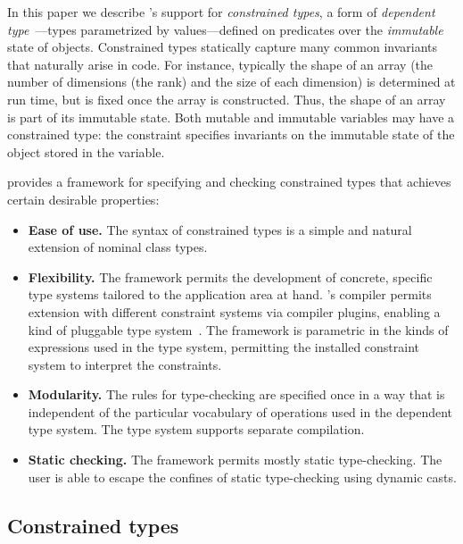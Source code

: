 In this paper we describe {\Xten}'s support for {\em
constrained types},
a form of {\em dependent
type}~\cite{dependent-types,xi99dependent,ocrz-ecoop03,aspinall-attapl,cayenne,epigram-matter,calc-constructions}---types parametrized by values---defined 
on predicates over the {\em immutable}
state of objects. Constrained types statically capture many common invariants
that naturally arise in code. For instance, typically the shape of an
array (the number of dimensions (the rank) and the size of each dimension)
is determined at
run time, but is fixed once the array is constructed. Thus, the shape of an
array is part of its immutable state.
Both mutable and immutable variables may have a constrained
type: the constraint specifies invariants on the immutable state
of the object stored in the variable. 

\Xten{} provides a framework for specifying and checking constrained types
that achieves certain desirable properties:
\begin{itemize}
\item 
{\bf Ease of use.}  
The syntax of constrained types is a simple and
natural extension of nominal class types.

\item
{\bf Flexibility.}
The framework
permits the development of concrete,
specific type systems tailored to the application area at
hand.  \Xten{}'s compiler permits extension with different constraint systems
via compiler plugins, enabling a kind of pluggable type system~\cite{bracha04-pluggable}.
The framework is parametric in the kinds of
expressions used in the type system, permitting the installed constraint
system to interpret the constraints.

\item
{\bf Modularity.}
The rules for type-checking
are specified once in a way that is independent of the
particular vocabulary of operations used in the dependent type
system.
The type system supports separate compilation.

\item
{\bf Static checking.}  The framework permits mostly static
type-checking. The user is able to escape the confines of
static type-checking using dynamic casts.
\end{itemize}

\subsection{Constrained types}

